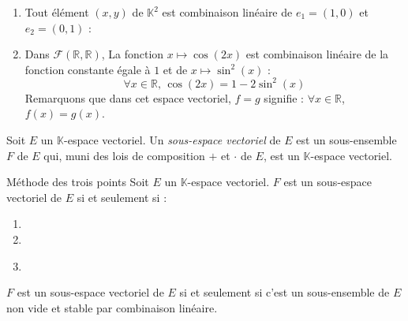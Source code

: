 \documentclass[french,11pt,twoside]{VcCours}
\begin{document}
\begin{Exemples}
\begin{enumerate}
\item Tout élément $(x,y)$ de $\mathbb{K}^2$ est combinaison linéaire de $e_1=(1,0)$ et $e_2=(0,1)$ :

\phantom{$(x,y) = x(1,0)+ y(0,1)= xe_1 + y e_2$}
\item Dans $\mathcal{F}(\mathbb{R},\mathbb{R})$, La fonction $x \mapsto \cos(2x)$ est combinaison linéaire de la fonction constante égale à $1$ et de $x \mapsto \sin^2(x)$ :
$$ \forall x \in \mathbb{R}, \, \cos(2x) = 1 - 2 \sin^2(x)$$
Remarquons que dans cet espace vectoriel, $f=g$ signifie : $\forall x \in \mathbb{R}$, $f(x)=g(x)$.
\end{enumerate}
\end{Exemples}



\begin{Definition}{} Soit $E$ un $\mathbb{K}$-espace vectoriel. Un \emph{sous-espace vectoriel} de $E$ est un sous-ensemble $F$ de $E$ qui, muni  des lois de composition $+$ et $\cdot$ de $E$, est un $\mathbb{K}$-espace vectoriel.
\end{Definition}

\begin{Proposition}{Méthode des trois points}
Soit $E$ un $\mathbb{K}$-espace vectoriel. $F$ est un sous-espace vectoriel de $E$ si et seulement si :
\begin{enumerate}
\item \phantom{$F \subset E$.}
\item {}
\item {}

$\phantom{jj}$
\end{enumerate}
\end{Proposition}

\begin{Remarque}{}
$F$ est un sous-espace vectoriel de $E$ si et seulement si c'est un sous-ensemble de $E$ non vide et stable par combinaison linéaire.
\end{Remarque}
\end{document}
